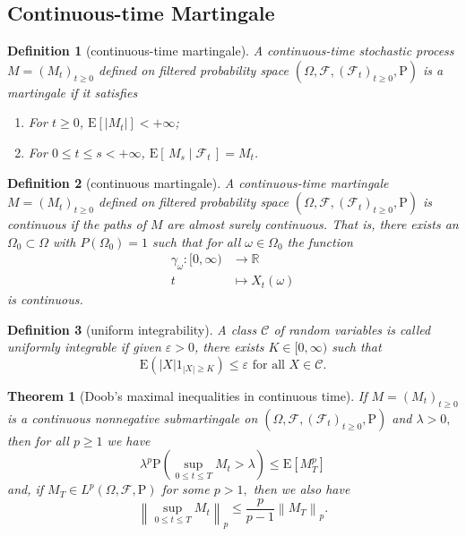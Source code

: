 \documentclass{article}
\newtheorem{definition}{Definition}[section]
\newtheorem{theorem}{Theorem}[section]
\theoremstyle{nonumberplain}
\begin{document}
\subsection{Continuous-time Martingale}
\begin{definition}[continuous-time martingale]
	A continuous-time stochastic process $M=(M_t)_{t\ge 0}$ defined on filtered probability space $(\Omega,\mathcal{F},(\mathcal{F}_{t})_{t\ge0},\mathrm{P})$ is a \emph{martingale} if it satisfies
	\begin{enumerate}
		\item For $t\ge0$, $\mathrm{E}[|M_t|]<+\infty$;
		\item For $0\le t\le s<+\infty$, $\mathrm{E}[\,M_{s}\mid\mathcal{F}_t\,]=M_t$.
	\end{enumerate}
\end{definition}
\begin{definition}[continuous martingale]
	A continuous-time martingale $M=(M_t)_{t\ge 0}$ defined on filtered probability space $(\Omega,\mathcal{F},(\mathcal{F}_{t})_{t\ge0},\mathrm{P})$ is continuous if the paths of $M$ are almost surely continuous. That is, there exists an $\Omega_{0} \subset \Omega$ with $P\left(\Omega_{0}\right)=1$ such that for all $\omega \in \Omega_{0}$ the function
	\begin{align*}
	\gamma_\omega:[0, \infty)&\longrightarrow\mathbb{R}\\
	t&\longmapsto X_{t}(\omega)
	\end{align*}
	is continuous.
\end{definition}

\begin{definition}[uniform integrability]
	A class $\mathcal {C}$ of random variables is called \emph{uniformly integrable} if given $\varepsilon >0$, there exists $K\in [0,\infty )$ such that 
	\[
	\mathrm{E}\left(|X| 1_{|X| \geq K}\right) \leq \varepsilon \text { for all } X \in \mathcal{C}.
	\]	
\end{definition}

\begin{theorem}[Doob's maximal inequalities in continuous time]
If $M=(M_{t})_{t\ge0}$ is a continuous nonnegative submartingale on $(\Omega,\mathcal{F},(\mathcal{F}_{t})_{t\ge0},\mathrm{P})$ and $\lambda>0,$ then for all $p \geq 1$ we have
\[
\lambda^{p} \mathrm{P}\left(\sup_{0 \le t \le T} M_{t}>\lambda\right) \le \mathrm{E}\left[M_{T}^{p}\right]
\]
and, if $M_{T} \in L^{p}(\Omega,\mathcal{F},\mathrm{P})$ for some $p>1,$ then we also have
\[
\left\|\sup_{0 \leq t \leq T} M_{t}\right\|_{p} \leq \frac{p}{p-1}\left\|M_{T}\right\|_{p}.
\]
\end{theorem}
\end{document}

